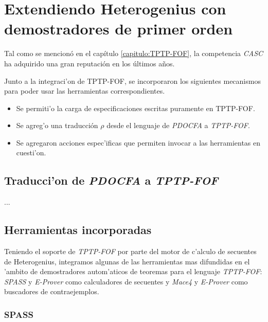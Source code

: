 \section{Extendiendo Heterogenius con demostradores de primer orden}

Tal como se mencionó en el capítulo \ref{capitulo:TPTP-FOF}, la competencia \textit{CASC} ha adquirido una gran reputación en los últimos años.

Junto a la integraci'on de TPTP-FOF, se incorporaron los siguientes mecanismos para poder usar las herramientas correspondientes.

\begin{itemize}
\item Se permiti'o la carga de especificaciones escritas puramente en TPTP-FOF.

\item Se agreg'o una traducción $\rho$ desde el lenguaje de \textit{PDOCFA} a \textit{TPTP-FOF}. 

\item Se agregaron acciones espec'ificas que permiten invocar a las herramientas en cuesti'on.
\end{itemize}

\subsection{Traducci'on de \emph{PDOCFA} a \emph{TPTP-FOF}}

...


\subsection{Herramientas incorporadas}

Teniendo el soporte de \textit{TPTP-FOF} por parte del motor de c'alculo de secuentes de Heterogenius, integramos algunas de las herramientas mas difundidas en el 'ambito de demostradores autom'aticos de teoremas para el lenguaje \textit{TPTP-FOF}: \textit{SPASS} \cite{WDFKSW09} y \textit{E-Prover} \cite{s13} como calculadores de secuentes y \textit{Mace4} \cite{m05} y \textit{E-Prover} como buscadores de contraejemplos.

\subsubsection{SPASS}

